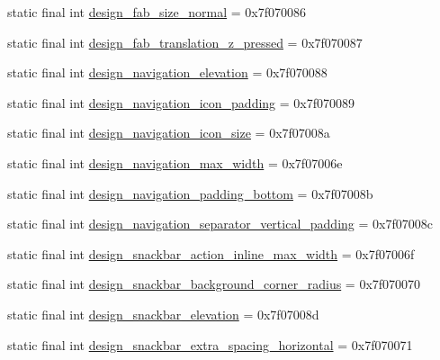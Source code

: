 \begin{CompactItemize}
static final int \hyperlink{classandroid_1_1support_1_1fragment_1_1_r_1_1dimen_a745e5c89a67f0509c8a9e8f494454ad}{design\_\-fab\_\-size\_\-normal} = 0x7f070086
\item 
static final int \hyperlink{classandroid_1_1support_1_1fragment_1_1_r_1_1dimen_84f2cfcffa9f9110cedab7231df9f454}{design\_\-fab\_\-translation\_\-z\_\-pressed} = 0x7f070087
\item 
static final int \hyperlink{classandroid_1_1support_1_1fragment_1_1_r_1_1dimen_223236509555da96c49abebe6445adb2}{design\_\-navigation\_\-elevation} = 0x7f070088
\item 
static final int \hyperlink{classandroid_1_1support_1_1fragment_1_1_r_1_1dimen_9ebccdb18dac8a87d379ef4d1fe8760b}{design\_\-navigation\_\-icon\_\-padding} = 0x7f070089
\item 
static final int \hyperlink{classandroid_1_1support_1_1fragment_1_1_r_1_1dimen_e0bf2f32a10362c1e4f2c4802564b928}{design\_\-navigation\_\-icon\_\-size} = 0x7f07008a
\item 
static final int \hyperlink{classandroid_1_1support_1_1fragment_1_1_r_1_1dimen_83f64aa6f9de57f70b3703e7caca38c0}{design\_\-navigation\_\-max\_\-width} = 0x7f07006e
\item 
static final int \hyperlink{classandroid_1_1support_1_1fragment_1_1_r_1_1dimen_771d73e398c7193576b1b20f52674168}{design\_\-navigation\_\-padding\_\-bottom} = 0x7f07008b
\item 
static final int \hyperlink{classandroid_1_1support_1_1fragment_1_1_r_1_1dimen_1b8bca1d8eb685013afe4d89cd0d84b9}{design\_\-navigation\_\-separator\_\-vertical\_\-padding} = 0x7f07008c
\item 
static final int \hyperlink{classandroid_1_1support_1_1fragment_1_1_r_1_1dimen_a8eab1d44d2a52f0d2c2f89c0b153e41}{design\_\-snackbar\_\-action\_\-inline\_\-max\_\-width} = 0x7f07006f
\item 
static final int \hyperlink{classandroid_1_1support_1_1fragment_1_1_r_1_1dimen_099037043439e0282f0784726d25d495}{design\_\-snackbar\_\-background\_\-corner\_\-radius} = 0x7f070070
\item 
static final int \hyperlink{classandroid_1_1support_1_1fragment_1_1_r_1_1dimen_be456349be72ba2e6941c368e33e7fbd}{design\_\-snackbar\_\-elevation} = 0x7f07008d
\item 
static final int \hyperlink{classandroid_1_1support_1_1fragment_1_1_r_1_1dimen_fee8359bbbcda88067c1954d2d637e4a}{design\_\-snackbar\_\-extra\_\-spacing\_\-horizontal} = 0x7f070071
\item 

\end{CompactItemize}

